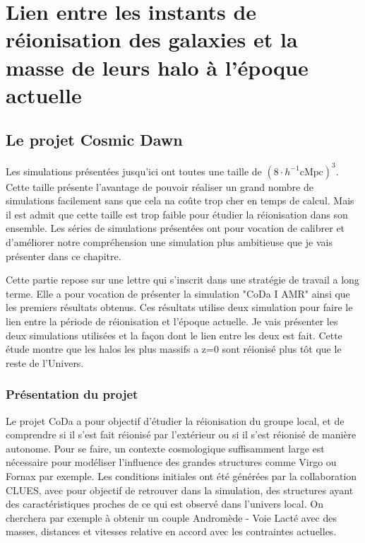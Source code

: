 \chapter{Lien entre les instants de réionisation des galaxies et la masse de leurs halo à l'époque actuelle}

\section{Le projet Cosmic Dawn}
\label{sec:CODAEMMA}

Les simulations présentées jusqu'ici ont toutes une taille de $\left( 8\cdot h^{-1} \mathrm{cMpc} \right)^3$.
Cette taille présente l'avantage de pouvoir réaliser un grand nombre de simulations facilement sans que cela na coûte trop cher en temps de calcul.
Mais il est admit que cette taille est trop faible pour étudier la réionisation dans son ensemble.
Les séries de simulations présentées ont pour vocation de calibrer et d'améliorer notre compréhension une simulation plus ambitieuse que je vais présenter dans ce chapitre.

Cette partie repose sur une lettre qui s'inscrit dans une stratégie de travail a long terme.
Elle a pour vocation de présenter la simulation "\ac{CoDa} I AMR" ainsi que les premiers résultats obtenus.
Ces résultats utilise deux simulation pour faire le lien entre la période de réionisation et l’époque actuelle.
Je vais présenter les deux simulations utilisées et la façon dont le lien entre les deux est fait.
Cette étude montre que les halos les plus massifs a z=0 sont réionisé plus tôt que le reste de l'Univers.


\subsection{Présentation du projet}

Le projet \ac{CoDa} a pour objectif d'étudier la réionisation du groupe local, et de comprendre si il s'est fait réionisé par l'extérieur ou si il s'est réionisé de manière autonome.
Pour se faire, un contexte cosmologique suffisamment large est nécessaire pour modéliser l'influence des grandes structures comme Virgo ou Fornax par exemple.
Les conditions initiales ont été générées par la collaboration \ac{CLUES}, avec pour objectif de retrouver dans la simulation, des structures ayant des caractéristiques proches de ce qui est observé dans l'univers local.
On cherchera par exemple à obtenir un couple Andromède - Voie Lacté avec des masses, distances et vitesses relative en accord avec les contraintes actuelles.


